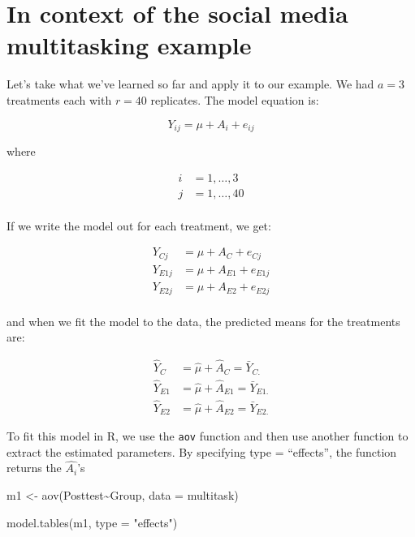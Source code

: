 \documentclass[
  letterpaper,
  DIV=11,
  numbers=noendperiod,
  oneside]{scrreprt}
\newenvironment{Shaded}{\begin{snugshade}}{\end{snugshade}}
\newcommand{\AttributeTok}[1]{\textcolor[rgb]{0.40,0.45,0.13}{#1}}
\newcommand{\FunctionTok}[1]{\textcolor[rgb]{0.28,0.35,0.67}{#1}}
\newcommand{\NormalTok}[1]{\textcolor[rgb]{0.00,0.23,0.31}{#1}}
\newcommand{\OtherTok}[1]{\textcolor[rgb]{0.00,0.23,0.31}{#1}}
\newcommand{\SpecialCharTok}[1]{\textcolor[rgb]{0.37,0.37,0.37}{#1}}
\newcommand{\StringTok}[1]{\textcolor[rgb]{0.13,0.47,0.30}{#1}}
\begin{document}
\section{In context of the social media multitasking
example}\label{in-context-of-the-social-media-multitasking-example}

Let's take what we've learned so far and apply it to our example. We had
\(a = 3\) treatments each with \(r=40\) replicates. The model equation
is:

\[ Y_{ij} = \mu + A_{i} + e_{ij}  \]

where

\begin{equation}
\begin{aligned}
i & = 1, \dots, 3  \\
j & = 1, \dots, 40 \\
\end{aligned}
\end{equation}

If we write the model out for each treatment, we get:

\begin{equation}
\begin{aligned}
Y_{Cj} &= \mu + A_C + e_{Cj} \\ 
Y_{E1j} &= \mu + A_{E1} + e_{E1j} \\ 
Y_{E2j} &= \mu + A_{E2} + e_{E2j} \\
\end{aligned}
\end{equation}

and when we fit the model to the data, the predicted means for the
treatments are:

\begin{equation}
\begin{aligned}
\hat{Y}_{C} &= \hat{\mu} + \hat{A}_C = \bar{Y}_{C.}\\ 
\hat{Y}_{E1} &= \hat{\mu} + \hat{A}_{E1} = \bar{Y}_{E1.}\\ 
\hat{Y}_{E2} &= \hat{\mu} + \hat{A}_{E2} = \bar{Y}_{E2.}
\end{aligned}
\end{equation}

To fit this model in R, we use the \texttt{aov} function and then use
another function to extract the estimated parameters. By specifying type
= ``effects'', the function returns the \(\hat{A_i}\)'s

\begin{Shaded}
\begin{Highlighting}[]
\NormalTok{m1 }\OtherTok{\textless{}{-}} \FunctionTok{aov}\NormalTok{(Posttest}\SpecialCharTok{\textasciitilde{}}\NormalTok{Group, }\AttributeTok{data =}\NormalTok{ multitask)}

\FunctionTok{model.tables}\NormalTok{(m1, }\AttributeTok{type =} \StringTok{"effects"}\NormalTok{)}
\end{Highlighting}
\end{Shaded}
\end{document}
